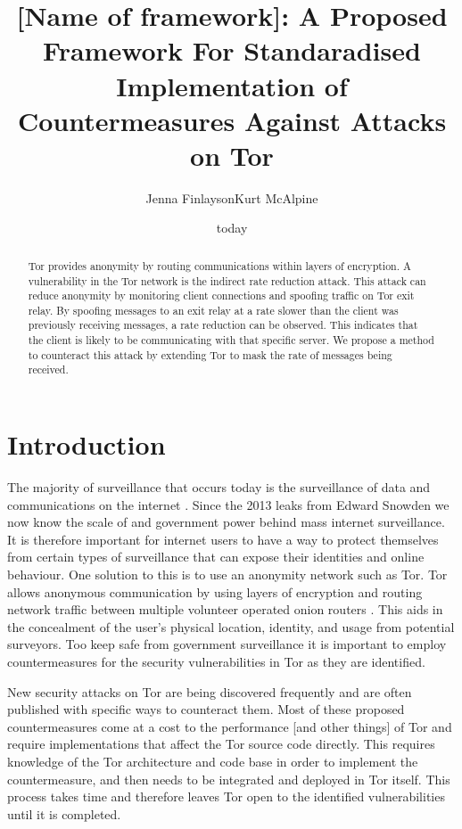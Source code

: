\documentclass[9pt,technote]{IEEEtran}
\title{[Name of framework]: A Proposed Framework For Standaradised Implementation of Countermeasures Against Attacks on Tor}
\date{today}
\author{Jenna FinlaysonKurt McAlpine}
\begin{document}
 
\maketitle

\begin{abstract} Tor provides anonymity by routing communications within layers
of encryption. A vulnerability in the Tor network is the indirect rate reduction
attack. This attack can reduce anonymity by monitoring client connections and
spoofing traffic on Tor exit relay. By spoofing messages to an exit relay at a
rate slower than the client was previously receiving messages, a rate reduction
can be observed. This indicates that the client is likely to be communicating
with that specific server. We propose a method to counteract this attack by
extending Tor to mask the rate of messages being received. \end{abstract}

\section{Introduction} 
The majority of surveillance that occurs today is the
surveillance of data and communications on the internet
\cite{diffie2008brave}. Since the 2013 leaks from Edward Snowden we now know the scale of and government power behind mass internet
surveillance. It is therefore important for internet users to have a way to
protect themselves from certain types of surveillance that can expose their identities and online behaviour. One solution to this is to use an anonymity network such as Tor. Tor allows anonymous communication by using layers of encryption and routing network
traffic between multiple volunteer operated onion routers \cite{tor}. This aids in the concealment of the
user's physical location, identity, and usage from potential surveyors. Too keep
safe from government surveillance it is important to employ countermeasures for the security
vulnerabilities in Tor as they are identified.

New security attacks on Tor are being discovered frequently and are often published with specific ways to counteract them. Most of these proposed countermeasures come at a cost to the performance [and other things] of Tor and require implementations that affect the Tor source code directly. This requires knowledge of the Tor architecture and code base in order to implement the countermeasure, and then needs to be integrated and deployed in Tor itself. This process takes time and therefore leaves Tor open to the identified vulnerabilities until it is completed.
\end{document}
